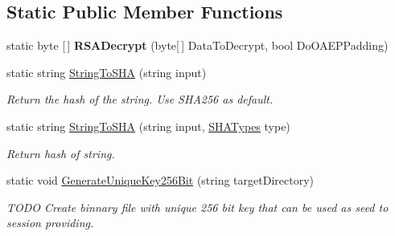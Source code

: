 \subsection*{Static Public Member Functions}
\begin{DoxyCompactItemize}
\item 
\mbox{\label{class_uniform_server_1_1_security_a_p_i_a46e3150c9c1024c0cc9a56b03f02624e}} 
static byte \mbox{[}$\,$\mbox{]} {\bfseries R\+S\+A\+Decrypt} (byte\mbox{[}$\,$\mbox{]} Data\+To\+Decrypt, bool Do\+O\+A\+E\+P\+Padding)
\item 
static string \mbox{\hyperlink{class_uniform_server_1_1_security_a_p_i_a45566f4aed87cbfabbcf00b7fca118db}{String\+To\+S\+HA}} (string input)
\begin{DoxyCompactList}\small\item\em Return the hash of the string. Use S\+H\+A256 as default. \end{DoxyCompactList}\item 
static string \mbox{\hyperlink{class_uniform_server_1_1_security_a_p_i_a417561751e136d3c7d1fdeab5cbcd18d}{String\+To\+S\+HA}} (string input, \mbox{\hyperlink{class_uniform_server_1_1_security_a_p_i_a0013616bf69cff8555e697c0c4960240}{S\+H\+A\+Types}} type)
\begin{DoxyCompactList}\small\item\em Return hash of string. \end{DoxyCompactList}\item 
static void \mbox{\hyperlink{class_uniform_server_1_1_security_a_p_i_a47f4dbc862a92f24b030d52b2a79f92b}{Generate\+Unique\+Key256\+Bit}} (string target\+Directory)
\begin{DoxyCompactList}\small\item\em T\+O\+DO Create binnary file with unique 256 bit key that can be used as seed to session providing. \end{DoxyCompactList}\end{DoxyCompactItemize}
